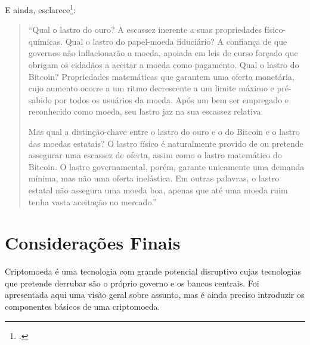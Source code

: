 E ainda, esclarece\footnote{\cite[p. 75]{bib:fernando-ulrich}.}:
\begin{quote}
``Qual o lastro do ouro? A escassez inerente a suas propriedades físico-químicas. Qual o lastro do papel-moeda fiduciário? A confiança de que governos não inflacionarão a moeda, apoiada em leis de curso forçado que obrigam os cidadãos a aceitar a moeda como pagamento. Qual o lastro do Bitcoin? Propriedades matemáticas que garantem uma oferta monetária, cujo aumento ocorre a um ritmo decrescente a um limite máximo e pré-sabido por todos os usuários da moeda. Após um bem ser empregado e reconhecido como moeda, seu lastro jaz na sua escassez relativa.

Mas qual a distinção-chave entre o lastro do ouro e o do Bitcoin e o lastro das moedas estatais? O lastro físico é naturalmente provido de ou pretende assegurar uma escassez de oferta, assim como o lastro matemático do Bitcoin. O lastro governamental, porém, garante unicamente uma demanda mínima, mas não uma oferta inelástica. Em outras palavras, o lastro estatal não assegura uma moeda boa, apenas que até uma moeda ruim tenha vasta aceitação no mercado.''
\end{quote}

\section{Considerações Finais}

Criptomoeda é uma tecnologia com grande potencial disruptivo cujas tecnologias que pretende derrubar são o próprio governo e os bancos centrais. Foi apresentada aqui uma visão geral sobre assunto, mas é ainda preciso introduzir os componentes básicos de uma criptomoeda.